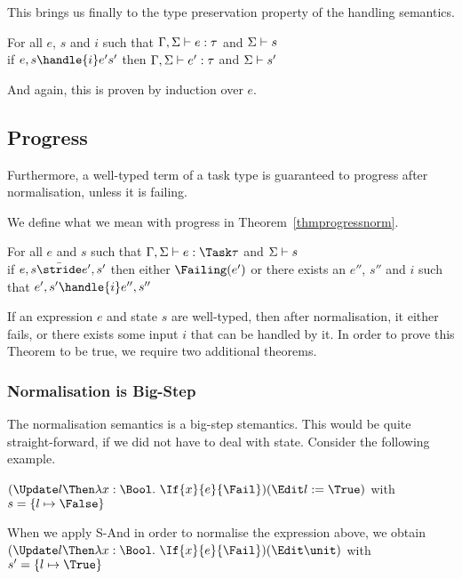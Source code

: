 This brings us finally to the type preservation property of the handling semantics.

\begin{theorem}
  For all $e$, $s$ and $i$ such that $\Gamma,\Sigma\vdash e:\tau$ and $\Sigma\vdash s$\\
  if $ e,s \handle{i} e's'$ then $\Gamma,\Sigma\vdash e':\tau$ and $\Sigma\vdash s'$
   \label{thmpreshandle}
\end{theorem}

And again, this is proven by induction over $e$.

\subsection{Progress}

Furthermore, a well-typed term of a task type is guaranteed to progress after
normalisation, unless it is failing.

We define what we mean with progress in Theorem~\ref{thmprogressnorm}.

\begin{theorem}
  For all $e$ and $s$ such that $\Gamma,\Sigma\infers e:\Task\tau$ and $\Sigma\vdash s$\\
  if $e,s \bar{\stride} e',s'$ then either $\Failing(e')$ or there exists an $e''$, $s''$ and $i$ such that $e',s'\handle{i}e'',s''$
  \label{thmprogressnorm}
\end{theorem}

If an expression $e$ and state $s$ are well-typed, then after normalisation, it
either fails, or there exists some input $i$ that can be handled by it.
In order to prove this Theorem to be true, we require two additional theorems.

\subsubsection{Normalisation is Big-Step}

The normalisation semantics is a big-step stemantics. This would be quite
straight-forward, if we did not have to deal with state. Consider the following
example.

$(\Update l \Then \lambda x:\Bool .\ \If{x}{e}{\Fail})\And (\Edit l:=\True)$ with $s=\{l\mapsto \False\}$

When we apply S-And in order to normalise the expression above, we obtain
$(\Update l \Then \lambda x:\Bool .\ \If{x}{e}{\Fail})\And (\Edit \unit)$ with $s'=\{l\mapsto \True\}$

